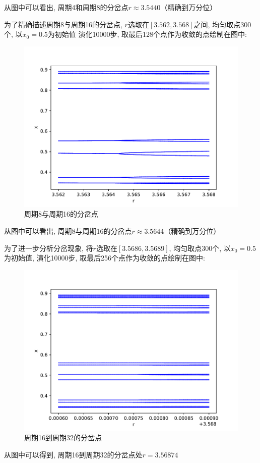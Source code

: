 \documentclass[a4paper,zihao=5,UTF8]{ctexart}
\begin{document}
    \par 
    从图中可以看出, 周期4和周期8的分岔点$r\approx 3.5440$（精确到万分位）
    \par 
    为了精确描述周期8与周期16的分岔点, $r$选取在$[3.562, 3.568]$之间, 均匀取点300个, 以$x_0 = 0.5$为初始值
    演化10000步, 取最后128个点作为收敛的点绘制在图中:
    \begin{figure}[htbp]
        \centering
        \includegraphics[scale=0.5]{6_4.pdf}
        \caption{周期8与周期16的分岔点}
    \end{figure}
    \par 
    从图中可以看出, 周期8与周期16的分岔点$r\approx 3.5644$（精确到万分位）
    \par 
    为了进一步分析分岔现象, 将$r$选取在$[3.5686, 3.5689]$, 均匀取点300个, 以$x_0 = 0.5$为初始值, 演化10000步, 
    取最后256个点作为收敛的点绘制在图中: 
    \begin{figure}[htbp]
        \centering
        \includegraphics[scale=0.5]{6_5.pdf}
        \caption{周期16到周期32的分岔点}
    \end{figure}
    从图中可以得到, 周期16到周期32的分岔点处$r = 3.56874$
\end{document}
